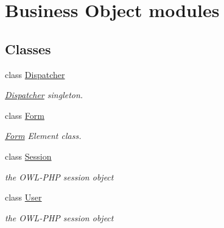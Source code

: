 \section{Business Object modules}
\label{group__OWL__BO__LAYER}
\subsection*{Classes}
\begin{DoxyCompactItemize}
\item 
class \hyperlink{classDispatcher}{Dispatcher}
\begin{DoxyCompactList}\small\item\em \hyperlink{classDispatcher}{Dispatcher} singleton. \item\end{DoxyCompactList}\item 
class \hyperlink{classForm}{Form}
\begin{DoxyCompactList}\small\item\em \hyperlink{classForm}{Form} Element class. \item\end{DoxyCompactList}\item 
class \hyperlink{classSession}{Session}
\begin{DoxyCompactList}\small\item\em the OWL-\/PHP session object \item\end{DoxyCompactList}\item 
class \hyperlink{classUser}{User}
\begin{DoxyCompactList}\small\item\em the OWL-\/PHP session object \item\end{DoxyCompactList}\end{DoxyCompactItemize}
